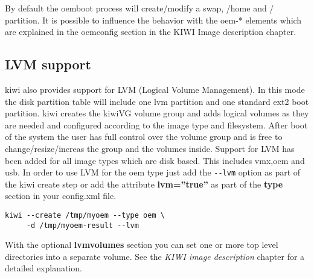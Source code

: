 By default the oemboot process will create/modify a swap, /home and /
partition. It is possible to influence the behavior with the
oem-* elements which are explained in the oemconfig section in the
KIWI Image description chapter.



\subsection{LVM support}

kiwi also provides support for LVM (Logical Volume Management). In this
mode the disk partition table will include one lvm partition and one
standard ext2 boot partition. kiwi creates the kiwiVG volume group and
adds logical volumes as they are needed and configured according to the
image type and filesystem. After boot of the system the user has full
control over the volume group and is free to change/resize/increas the
group and the volumes inside. Support for LVM has been added for all
image types which are disk based. This includes vmx,oem and usb.
In order to use LVM for the oem type just add the \verb+--lvm+ option
as part of the kiwi create step or add the attribute \textbf{lvm=''true''}
as part of the \textbf{type} section in your config.xml file.

\begin{Command}{12cm}
\begin{verbatim}
kiwi --create /tmp/myoem --type oem \
     -d /tmp/myoem-result --lvm
\end{verbatim}
\end{Command}

With the optional \textbf{lvmvolumes} section you can set one or
more top level directories into a separate volume. See the
\textit{KIWI image description} chapter for a detailed explanation.
